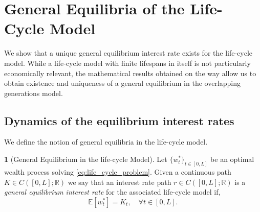 \documentclass[11pt,oneside,english,reqno,dvipsnames,table]{amsart}
\numberwithin{equation}{section}
\theoremstyle{plain}
\theoremstyle{definition}
\newtheorem{defn}[thm]{\protect\definitionname}
\theoremstyle{remark}
\newtheorem{rem}[thm]{\protect\remarkname}
\theoremstyle{plain}
\theoremstyle{plain}
\theoremstyle{plain}
\theoremstyle{plain}
\theoremstyle{plain}
\theoremstyle{plain}
\theoremstyle{plain}
\providecommand{\definitionname}{Definition}
\providecommand{\remarkname}{Remark}
\providecommand{\remarkname}{Remark}
\newcommand{\EE}{\mathbb{E}}
\newcommand{\RR}{\mathbb{R}}
\numberwithin{thm}{section}
\begin{document}
%
%


%



\section{General Equilibria of the Life-Cycle Model}\label{sec:life_cycle_gen_eq}

We show that a unique general equilibrium interest rate exists for the life-cycle model. 
While a life-cycle model with finite lifespans in itself is not particularly economically relevant, the mathematical results obtained on the way allow us to obtain existence and uniqueness of a general equilibrium in the overlapping generations model.



\subsection{Dynamics of the equilibrium interest rates}


We define the notion of general equilibria in the life-cycle model.

\begin{defn}[General Equilibrium in the life-cycle Model] \label{def:life_cycle_gen_eq}
	Let $\{w_t^*\}_{t\in [0,L]}$ be an optimal wealth process solving \eqref{eq:life_cycle_problem}. Given a continuous path  $K\in C([0,L];\RR) $ we say that an interest rate path $r\in C([0,L];\RR)$ is a \emph{general equilibrium interest rate} for the associated life-cycle model if,
\begin{equation}\label{eq:capital_supply}
		\EE[w_t^*]=K_t,\quad \forall t\in [0,L]. 
	\end{equation}
\end{defn}
%
\end{document}
